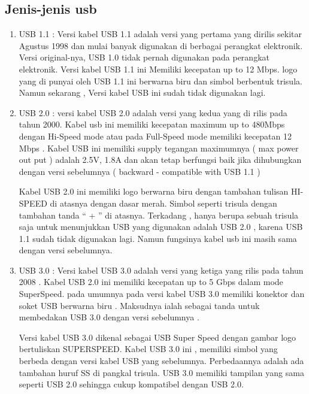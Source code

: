 \subsection {Jenis-jenis usb}
\begin {enumerate}
\item
	USB 1.1 : Versi kabel USB 1.1 adalah versi yang pertama yang dirilis sekitar Agustus 1998 dan mulai banyak digunakan di berbagai perangkat elektronik. Versi original-nya, USB 1.0 tidak pernah digunakan pada perangkat elektronik. Versi kabel USB 1.1 ini Memiliki kecepatan up to 12 Mbps. logo yang di punyai oleh USB 1.1 ini berwarna biru dan simbol berbentuk trisula. Namun sekarang , Versi kabel USB ini sudah tidak digunakan lagi.
\item
	USB 2.0 : versi kabel USB 2.0 adalah versi yang kedua yang di rilis pada tahun 2000. Kabel usb ini memiliki kecepatan maximum up to 480Mbps dengan Hi-Speed mode atau pada Full-Speed mode memiliki kecepatan 12 Mbps . Kabel USB ini memiliki supply tegangan maximumnya ( max power out put ) adalah 2.5V, 1.8A dan akan tetap berfungsi baik jika dihubungkan dengan versi sebelumnya ( backward - compatible with USB 1.1 )
	
	Kabel USB 2.0 ini memiliki logo berwarna biru dengan tambahan tulisan HI-SPEED di atasnya dengan dasar merah. Simbol seperti trisula dengan tambahan tanda “ + ” di atasnya. Terkadang , hanya berupa sebuah trisula saja untuk menunjukkan USB yang digunakan adalah USB 2.0 , karena USB 1.1 sudah tidak digunakan lagi. Namun fungsinya kabel usb ini masih sama dengan versi sebelumnya.
\item
	USB 3.0 : Versi kabel USB 3.0 adalah versi yang ketiga yang rilis pada tahun 2008 . Kabel USB 2.0 ini memiliki kecepatan up to 5 Gbps dalam mode SuperSpeed. pada umumnya pada versi kabel USB 3.0 memiliki konektor dan soket USB berwarna biru . Maksudnya ialah sebagai tanda untuk membedakan USB 3.0 dengan versi sebelumnya .
	
	Versi kabel USB 3.0 dikenal sebagai USB Super Speed dengan gambar logo bertuliskan SUPERSPEED. Kabel USB 3.0 ini , memiliki simbol yang berbeda dengan versi kabel USB yang sebelumnya. Perbedaannya adalah ada tambahan huruf SS di pangkal trisula. USB 3.0 memiliki tampilan yang sama seperti USB 2.0 sehingga cukup kompatibel dengan USB 2.0.
	

\end{enumerate}
